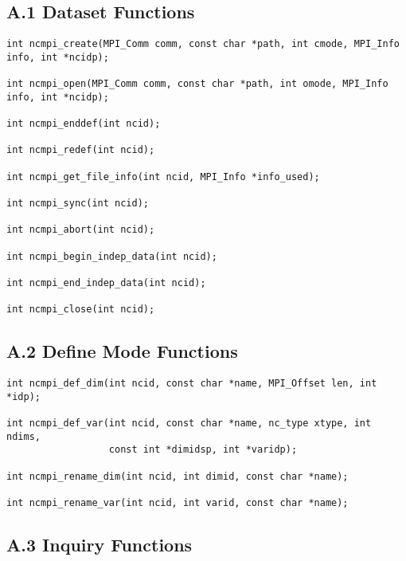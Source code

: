 %
%
\subsection*{A.1  Dataset Functions}

\begin{verbatim}
int ncmpi_create(MPI_Comm comm, const char *path, int cmode, MPI_Info info, int *ncidp);

int ncmpi_open(MPI_Comm comm, const char *path, int omode, MPI_Info info, int *ncidp);

int ncmpi_enddef(int ncid);

int ncmpi_redef(int ncid);

int ncmpi_get_file_info(int ncid, MPI_Info *info_used);

int ncmpi_sync(int ncid);

int ncmpi_abort(int ncid);

int ncmpi_begin_indep_data(int ncid);

int ncmpi_end_indep_data(int ncid);

int ncmpi_close(int ncid);
\end{verbatim}


%
%
\subsection*{A.2  Define Mode Functions}

\begin{verbatim}
int ncmpi_def_dim(int ncid, const char *name, MPI_Offset len, int *idp);

int ncmpi_def_var(int ncid, const char *name, nc_type xtype, int ndims,
                  const int *dimidsp, int *varidp);

int ncmpi_rename_dim(int ncid, int dimid, const char *name);

int ncmpi_rename_var(int ncid, int varid, const char *name);
\end{verbatim}

%
%
\subsection*{A.3  Inquiry Functions}

